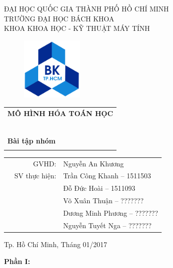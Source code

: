\documentclass[a4paper]{article}
\begin{document}
\begin{titlepage}
\begin{center}
ĐẠI HỌC QUỐC GIA THÀNH PHỐ HỒ CHÍ MINH \\
TRƯỜNG ĐẠI HỌC BÁCH KHOA \\
KHOA KHOA HỌC - KỸ THUẬT MÁY TÍNH 
\end{center}

\vspace{1cm}

\begin{figure}[h!]
\begin{center}
\includegraphics[width=3cm]{Images/hcmut.png}
\end{center}
\end{figure}

\vspace{1cm}


\begin{center}
\begin{tabular}{c}
\multicolumn{1}{l}{\textbf{{\Large\hspace{1 cm} MÔ HÌNH HÓA TOÁN HỌC\hspace{1 cm} }}}\\
~~\\
\hline
\\
\multicolumn{1}{l}{\textbf{{\Huge\hspace{1.7 cm} Bài tập nhóm}}}\\
\\
\hline
\end{tabular}
\end{center}

\vspace{1.5cm}

\begin{table}[h]
\begin{tabular}{rrl}
\hspace{5 cm} & GVHD: & Nguyễn An Khương\\

& SV thực hiện: & Trần Công Khanh -- 1511503 \\
& & Đỗ Đức Hoài -- 1511093 \\
& & Võ Xuân Thuận -- ??????? \\
& & Dương Minh Phương -- ??????? \\
& & Nguyễn Tuyết Nga -- ??????? \\
\end{tabular}
\end{table}
\vspace{1.5cm}
\begin{center}
{\footnotesize Tp. Hồ Chí Minh, Tháng 01/2017}
\end{center}
\end{titlepage}
\newpage
\textbf{{\Large Phần I: }}\\
\end{document}
